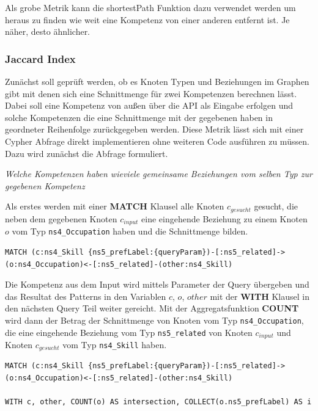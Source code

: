 Als grobe Metrik kann die shortestPath Funktion dazu verwendet werden um heraus zu finden wie weit eine Kompetenz von einer anderen entfernt ist. Je näher, desto ähnlicher. 

\subsubsection{Jaccard Index}

Zunächst soll geprüft werden, ob es Knoten Typen und Beziehungen im Graphen gibt mit denen sich eine Schnittmenge für zwei Kompetenzen berechnen lässt. Dabei soll eine Kompetenz von außen über die API als Eingabe erfolgen und solche Kompetenzen die eine Schnittmenge mit der gegebenen haben in geordneter Reihenfolge zurückgegeben werden. Diese Metrik lässt sich mit einer Cypher Abfrage direkt implementieren ohne weiteren Code ausführen zu müssen. Dazu wird zunächst die Abfrage formuliert. 

\textit{Welche Kompetenzen haben wieviele gemeinsame Beziehungen vom selben Typ zur gegebenen Kompetenz}
\newline

Als erstes werden mit einer \textbf{MATCH} Klausel alle Knoten $c_{gesucht}$ gesucht, die neben dem gegebenen Knoten $c_{input}$ eine eingehende Beziehung zu einem Knoten $o$ vom Typ \texttt{ns4\_Occupation} haben und die Schnittmenge bilden. 
\newline

\begin{lstlisting}
MATCH (c:ns4_Skill {ns5_prefLabel:{queryParam})-[:ns5_related]->(o:ns4_Occupation)<-[:ns5_related]-(other:ns4_Skill)
\end{lstlisting}



Die Kompetenz aus dem Input wird mittels Parameter der Query übergeben und das Resultat des Patterns in den Variablen $c$, $o$, $other$  mit der \textbf{WITH} Klausel in den nächsten Query Teil weiter gereicht. Mit der Aggregatsfunktion \textbf{COUNT} wird dann der Betrag der Schnittmenge von Knoten vom Typ \texttt{ns4\_Occupation}, die eine eingehende Beziehung vom Typ \texttt{ns5\_related} von Knoten $c_{input}$ und Knoten $c_{gesucht}$ vom Typ \texttt{ns4\_Skill} haben. 
\newline

\begin{lstlisting}
MATCH (c:ns4_Skill {ns5_prefLabel:{queryParam})-[:ns5_related]->(o:ns4_Occupation)<-[:ns5_related]-(other:ns4_Skill)

WITH c, other, COUNT(o) AS intersection, COLLECT(o.ns5_prefLabel) AS i

\end{lstlisting}

